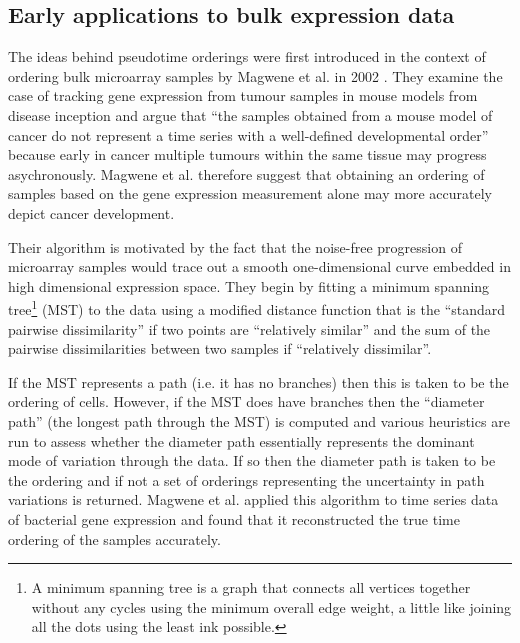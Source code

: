 \subsection{Early applications to bulk expression data} \label{sec:int:early}

The ideas behind pseudotime orderings were first introduced in the context of ordering bulk microarray samples by Magwene et al. in 2002 \cite{Magwene2003-bm}. They examine the case of tracking gene expression from tumour samples in mouse models from disease inception and argue that ``the samples obtained from a mouse model of cancer do not represent a time series with a well-defined developmental order''
because early in cancer multiple tumours within the same tissue may progress asychronously. Magwene et al. therefore suggest that obtaining an ordering of samples based on the gene expression measurement alone may more accurately depict cancer development.

Their algorithm is motivated by the fact that the noise-free progression of microarray samples would trace out a smooth one-dimensional curve embedded in high dimensional expression space. They begin by fitting a minimum spanning tree\footnote{
A minimum spanning tree is a graph that connects all vertices together without any cycles using the minimum overall edge weight, a little like joining all the dots using the least ink possible.
} (MST) to the data using a modified distance function that is the ``standard pairwise dissimilarity'' if two points are ``relatively similar'' and the sum of the pairwise dissimilarities between two samples if ``relatively dissimilar''.

If the MST represents a path (i.e. it has no branches) then this is taken to be the ordering of cells. However, if the MST does have branches then the ``diameter path'' (the longest path through the MST) is computed and various heuristics are run to assess whether the diameter path essentially represents the dominant mode of variation through the data. If so then the diameter path is taken to be the ordering and if not a set of orderings representing the uncertainty in path variations is returned. Magwene et al. applied this algorithm to time series data of bacterial gene expression and found that it reconstructed the true time ordering of the samples accurately.

